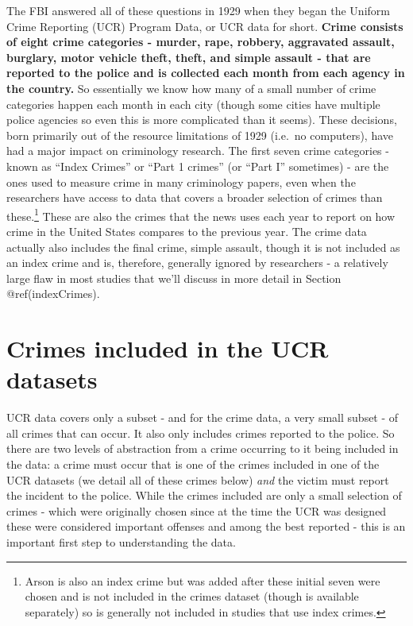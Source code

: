 \documentclass[
  12pt,
  openany]{book}
\begin{document}
The FBI answered all of these questions in 1929 when they began the Uniform Crime Reporting (UCR) Program Data, or UCR data for short. \textbf{Crime consists of eight crime categories - murder, rape, robbery, aggravated assault, burglary, motor vehicle theft, theft, and simple assault - that are reported to the police and is collected each month from each agency in the country.} So essentially we know how many of a small number of crime categories happen each month in each city (though some cities have multiple police agencies so even this is more complicated than it seems). These decisions, born primarily out of the resource limitations of 1929 (i.e.~no computers), have had a major impact on criminology research. The first seven crime categories - known as ``Index Crimes'' or ``Part 1 crimes'' (or ``Part I'' sometimes) - are the ones used to measure crime in many criminology papers, even when the researchers have access to data that covers a broader selection of crimes than these.\footnote{Arson is also an index crime but was added after these initial seven were chosen and is not included in the crimes dataset (though is available separately) so is generally not included in studies that use index crimes.} These are also the crimes that the news uses each year to report on how crime in the United States compares to the previous year. The crime data actually also includes the final crime, simple assault, though it is not included as an index crime and is, therefore, generally ignored by researchers - a relatively large flaw in most studies that we'll discuss in more detail in Section @ref(indexCrimes).

\hypertarget{crimes-included-in-the-ucr-datasets}{%
\section{Crimes included in the UCR datasets}\label{crimes-included-in-the-ucr-datasets}}

UCR data covers only a subset - and for the crime data, a very small subset - of all crimes that can occur. It also only includes crimes reported to the police. So there are two levels of abstraction from a crime occurring to it being included in the data: a crime must occur that is one of the crimes included in one of the UCR datasets (we detail all of these crimes below) \emph{and} the victim must report the incident to the police. While the crimes included are only a small selection of crimes - which were originally chosen since at the time the UCR was designed these were considered important offenses and among the best reported - this is an important first step to understanding the data.
\end{document}
